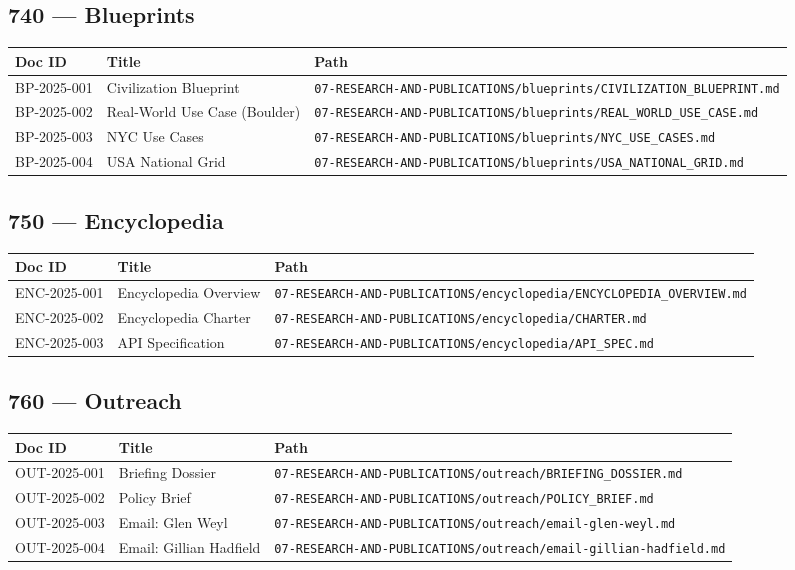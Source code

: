 \documentclass[11pt,a4paper]{article}
\begin{document}
\subsection{740 — Blueprints}

\begin{longtable}{p{2cm}p{8cm}p{3cm}}
\toprule
\textbf{Doc ID} & \textbf{Title} & \textbf{Path} \\
\midrule
BP-2025-001 & Civilization Blueprint & \texttt{07-RESEARCH-AND-PUBLICATIONS/blueprints/CIVILIZATION\_BLUEPRINT.md} \\
BP-2025-002 & Real-World Use Case (Boulder) & \texttt{07-RESEARCH-AND-PUBLICATIONS/blueprints/REAL\_WORLD\_USE\_CASE.md} \\
BP-2025-003 & NYC Use Cases & \texttt{07-RESEARCH-AND-PUBLICATIONS/blueprints/NYC\_USE\_CASES.md} \\
BP-2025-004 & USA National Grid & \texttt{07-RESEARCH-AND-PUBLICATIONS/blueprints/USA\_NATIONAL\_GRID.md} \\
\bottomrule
\end{longtable}

\subsection{750 — Encyclopedia}

\begin{longtable}{p{2cm}p{8cm}p{3cm}}
\toprule
\textbf{Doc ID} & \textbf{Title} & \textbf{Path} \\
\midrule
ENC-2025-001 & Encyclopedia Overview & \texttt{07-RESEARCH-AND-PUBLICATIONS/encyclopedia/ENCYCLOPEDIA\_OVERVIEW.md} \\
ENC-2025-002 & Encyclopedia Charter & \texttt{07-RESEARCH-AND-PUBLICATIONS/encyclopedia/CHARTER.md} \\
ENC-2025-003 & API Specification & \texttt{07-RESEARCH-AND-PUBLICATIONS/encyclopedia/API\_SPEC.md} \\
\bottomrule
\end{longtable}

\subsection{760 — Outreach}

\begin{longtable}{p{2cm}p{8cm}p{3cm}}
\toprule
\textbf{Doc ID} & \textbf{Title} & \textbf{Path} \\
\midrule
OUT-2025-001 & Briefing Dossier & \texttt{07-RESEARCH-AND-PUBLICATIONS/outreach/BRIEFING\_DOSSIER.md} \\
OUT-2025-002 & Policy Brief & \texttt{07-RESEARCH-AND-PUBLICATIONS/outreach/POLICY\_BRIEF.md} \\
OUT-2025-003 & Email: Glen Weyl & \texttt{07-RESEARCH-AND-PUBLICATIONS/outreach/email-glen-weyl.md} \\
OUT-2025-004 & Email: Gillian Hadfield & \texttt{07-RESEARCH-AND-PUBLICATIONS/outreach/email-gillian-hadfield.md} \\
\bottomrule
\end{longtable}
\end{document}
